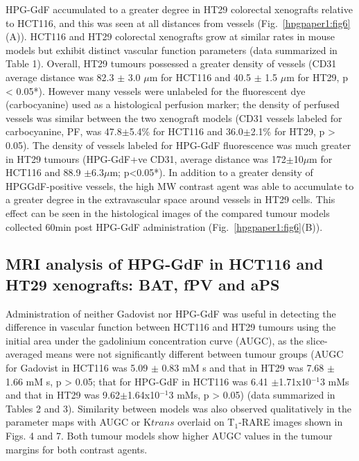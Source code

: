 HPG-GdF accumulated to a greater degree in HT29 colorectal xenografts relative to HCT116, and this was seen at all distances from vessels (Fig.~\ref{hpgpaper1:fig6}(A)).
HCT116 and HT29 colorectal xenografts grow at similar rates in mouse models but exhibit distinct vascular function parameters (data summarized in Table 1).
Overall, HT29 tumours possessed a greater density of vessels (CD31 average distance was 82.3 $\pm$ 3.0 $\mu$m for HCT116 and 40.5 $\pm$ 1.5 $\mu$m for HT29, p < 0.05*).
However many vessels were unlabeled for the fluorescent dye (carbocyanine) used as a histological perfusion marker; the density of perfused vessels was similar between the two xenograft models (CD31 vessels labeled for carbocyanine, PF, was 47.8$\pm$5.4\% for HCT116 and 36.0$\pm$2.1\% for HT29, p > 0.05).
The density of vessels labeled for HPG-GdF fluorescence was much greater in HT29 tumours (HPG-GdF+ve CD31, average distance was 172$\pm$10$\mu$m for HCT116 and 88.9 $\pm$6.3$\mu$m; p<0.05*).
In addition to a greater density of HPGGdF-positive vessels, the high MW contrast agent was able to accumulate to a greater degree in the extravascular space around vessels in HT29 cells.
This effect can be seen in the histological images of the compared tumour models collected 60min post HPG-GdF administration (Fig.~\ref{hpgpaper1:fig6}(B)).

\subsection{MRI analysis of HPG-GdF in HCT116 and HT29 xenografts: BAT, fPV and aPS}

Administration of neither Gadovist nor HPG-GdF was useful in detecting the difference in vascular function between HCT116 and HT29 tumours using the initial area under the gadolinium concentration curve (AUGC), as the slice-averaged means were not significantly different between tumour groups (AUGC for Gadovist in HCT116 was 5.09 $\pm$ 0.83 mM s and that in HT29 was 7.68 $\pm$ 1.66 mM s, p > 0.05; that for HPG-GdF in HCT116 was 6.41 $\pm$1.71x10$^{-1}$3 mMs and that in HT29 was 9.62$\pm$1.64x10$^{-1}$3 mMs, p > 0.05) (data summarized in Tables 2 and 3).
Similarity between models was also observed qualitatively in the parameter maps with AUGC or K${trans}$ overlaid on T$_1$-RARE images shown in Figs.
4 and 7.
Both tumour models show higher AUGC values in the tumour margins for both contrast agents.

